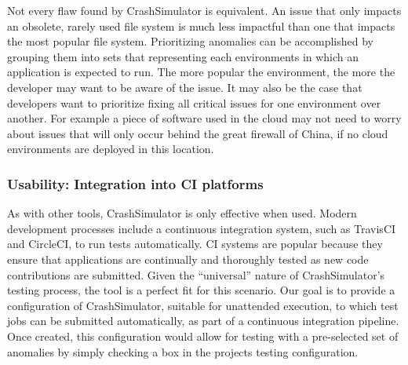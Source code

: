 Not every flaw found by CrashSimulator is equivalent.  An issue that only
impacts an obsolete, rarely used file system is much less impactful than
one that impacts the most popular file system.  Prioritizing anomalies
can be accomplished by grouping them into sets that representing each 
environments in which an application is expected to run. The more popular
the environment, the more the developer may want to be aware of the issue.
It may also be the case that developers want to prioritize fixing all 
critical issues for one environment over another.  For example a piece
of software used in the cloud may not need to worry about issues that will only
occur behind the great firewall of China, if no cloud environments are deployed in this location.


%
%

\subsubsection{Usability: Integration into CI platforms}

As with other tools, CrashSimulator is only effective when used.  Modern 
development processes include a continuous integration system, such as TravisCI
and CircleCI, to run tests automatically.  CI systems are popular because they
ensure that applications are continually and thoroughly tested as new code
contributions are submitted.  Given the ``universal'' nature of
CrashSimulator's testing process, the tool is a perfect fit for this
scenario.  Our goal is to provide a configuration of CrashSimulator,
suitable for unattended execution, to which test jobs can be submitted
automatically, as part of a continuous integration pipeline.  Once created,
this configuration would allow for testing with a
pre-selected set of anomalies by simply checking a box in the projects
testing configuration.

